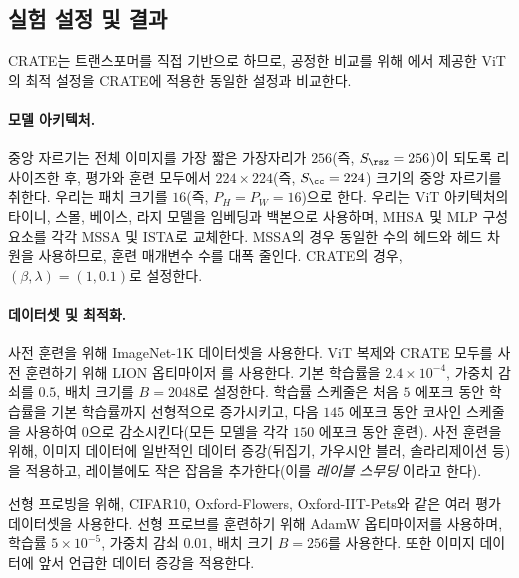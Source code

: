 \documentclass[../../book-main_ko.tex]{subfiles}
\begin{document}
\subsection{실험 설정 및 결과}\label{sub:image_classification_experiments}

CRATE는 트랜스포머를 직접 기반으로 하므로, 공정한 비교를 위해 \cite{dosovitskiy2020image,touvron2020training}에서 제공한 ViT의 최적 설정을 CRATE에 적용한 동일한 설정과 비교한다.

\paragraph{모델 아키텍처.} 중앙 자르기는 전체 이미지를 가장 짧은 가장자리가 \(256\)(즉, \(S_{\rsz} = 256\))이 되도록 리사이즈한 후, 평가와 훈련 모두에서 \(224 \times 224\)(즉, \(S_{\cc} = 224\)) 크기의 중앙 자르기를 취한다. 우리는 패치 크기를 \(16\)(즉, \(P_{H} = P_{W} = 16\))으로 한다. 우리는 ViT \cite{dosovitskiy2020image} 아키텍처의 타이니, 스몰, 베이스, 라지 모델을 임베딩과 백본으로 사용하며, MHSA 및 MLP 구성 요소를 각각 MSSA 및 ISTA로 교체한다. MSSA의 경우 동일한 수의 헤드와 헤드 차원을 사용하므로, 훈련 매개변수 수를 대폭 줄인다. CRATE의 경우, \((\beta, \lambda) = (1, 0.1)\)로 설정한다.

\paragraph{데이터셋 및 최적화.} 사전 훈련을 위해 ImageNet-1K 데이터셋을 사용한다. ViT 복제와 CRATE 모두를 사전 훈련하기 위해 LION 옵티마이저 \citep{chen2024symbolic}를 사용한다. 기본 학습률을 \(2.4 \times 10^{-4}\), 가중치 감쇠를 \(0.5\), 배치 크기를 \(B = 2048\)로 설정한다. 학습률 스케줄은 처음 \(5\) 에포크 동안 학습률을 기본 학습률까지 선형적으로 증가시키고, 다음 \(145\) 에포크 동안 코사인 스케줄을 사용하여 \(0\)으로 감소시킨다(모든 모델을 각각 \(150\) 에포크 동안 훈련). 사전 훈련을 위해, 이미지 데이터에 일반적인 데이터 증강(뒤집기, 가우시안 블러, 솔라리제이션 등)을 적용하고, 레이블에도 작은 잡음을 추가한다(이를 \textit{레이블 스무딩} \citep{muller2019does}이라고 한다).

선형 프로빙을 위해, CIFAR10, Oxford-Flowers, Oxford-IIT-Pets와 같은 여러 평가 데이터셋을 사용한다. 선형 프로브를 훈련하기 위해 AdamW 옵티마이저를 사용하며, 학습률 \(5 \times 10^{-5}\), 가중치 감쇠 \(0.01\), 배치 크기 \(B = 256\)를 사용한다. 또한 이미지 데이터에 앞서 언급한 데이터 증강을 적용한다.
\end{document}
